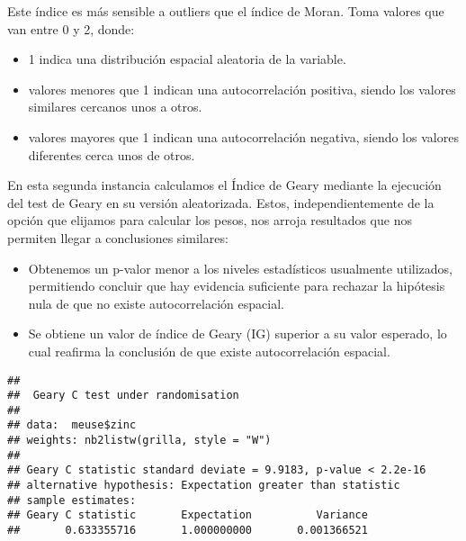 \documentclass[
  12pt,
]{article}
\newenvironment{Shaded}{\begin{snugshade}}{\end{snugshade}}
\newcommand{\AttributeTok}[1]{\textcolor[rgb]{0.77,0.63,0.00}{#1}}
\newcommand{\ConstantTok}[1]{\textcolor[rgb]{0.00,0.00,0.00}{#1}}
\newcommand{\FunctionTok}[1]{\textcolor[rgb]{0.00,0.00,0.00}{#1}}
\newcommand{\NormalTok}[1]{#1}
\newcommand{\SpecialCharTok}[1]{\textcolor[rgb]{0.00,0.00,0.00}{#1}}
\newcommand{\StringTok}[1]{\textcolor[rgb]{0.31,0.60,0.02}{#1}}
\begin{document}
Este índice es más sensible a outliers que el índice de Moran. Toma
valores que van entre 0 y 2, donde:

\begin{itemize}
\item
  1 indica una distribución espacial aleatoria de la variable.
\item
  valores menores que 1 indican una autocorrelación positiva, siendo los
  valores similares cercanos unos a otros.
\item
  valores mayores que 1 indican una autocorrelación negativa, siendo los
  valores diferentes cerca unos de otros.
\end{itemize}

En esta segunda instancia calculamos el Índice de Geary mediante la
ejecución del test de Geary en su versión aleatorizada. Estos,
independientemente de la opción que elijamos para calcular los pesos,
nos arroja resultados que nos permiten llegar a conclusiones similares:

\begin{itemize}
\item
  Obtenemos un p-valor menor a los niveles estadísticos usualmente
  utilizados, permitiendo concluir que hay evidencia suficiente para
  rechazar la hipótesis nula de que no existe autocorrelación espacial.
\item
  Se obtiene un valor de índice de Geary (IG) superior a su valor
  esperado, lo cual reafirma la conclusión de que existe autocorrelación
  espacial.
\end{itemize}

\begin{Shaded}
\end{Shaded}

\begin{verbatim}
## 
##  Geary C test under randomisation
## 
## data:  meuse$zinc 
## weights: nb2listw(grilla, style = "W") 
## 
## Geary C statistic standard deviate = 9.9183, p-value < 2.2e-16
## alternative hypothesis: Expectation greater than statistic
## sample estimates:
## Geary C statistic       Expectation          Variance 
##       0.633355716       1.000000000       0.001366521
\end{verbatim}
\end{document}
